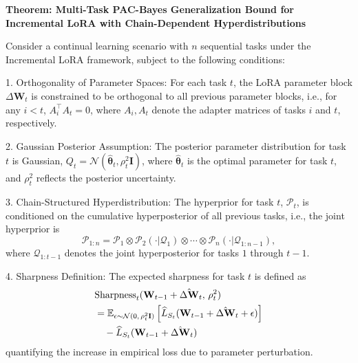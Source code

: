 \documentclass[letterpaper]{article} %
\begin{document}
\textbf{Theorem: Multi-Task PAC-Bayes Generalization Bound for Incremental LoRA with Chain-Dependent Hyperdistributions}


Consider a continual learning scenario with $n$ sequential tasks under the Incremental LoRA framework, subject to the following conditions:

1. Orthogonality of Parameter Spaces: For each task $t$, the LoRA parameter block $\Delta\mathbf{W}_t$ is constrained to be orthogonal to all previous parameter blocks, i.e., for any $i < t$, $A_i^\top A_t = 0$, where $A_i, A_t$ denote the adapter matrices of tasks $i$ and $t$, respectively.

2. Gaussian Posterior Assumption: The posterior parameter distribution for task $t$ is Gaussian, $Q_t = \mathcal{N}(\hat{\boldsymbol{\theta}}_t, \rho_t^2 \mathbf{I})$, where $\hat{\boldsymbol{\theta}}_t$ is the optimal parameter for task $t$, and $\rho_t^2$ reflects the posterior uncertainty.

3. Chain-Structured Hyperdistribution: The hyperprior for task $t$, $\mathcal{P}_t$, is conditioned on the cumulative hyperposterior of all previous tasks, i.e., the joint hyperprior is
   $$
   \mathcal{P}_{1:n} = \mathcal{P}_1 \otimes \mathcal{P}_2(\cdot|\mathcal{Q}_1) \otimes \cdots \otimes \mathcal{P}_n(\cdot|\mathcal{Q}_{1:n-1}),
   $$ where $\mathcal{Q}_{1:t-1}$ denotes the joint hyperposterior for tasks $1$ through $t-1$.

4. Sharpness Definition: The expected sharpness for task $t$ is defined as
\begin{align}
&\mathrm{Sharpness}_t(\mathbf{W}_{t-1} + \hat{\Delta\mathbf{W}}_t,\, \rho_t^2) \notag\\
& = \mathbb{E}_{\epsilon \sim \mathcal{N}(0,\, \rho_t^2 \mathbf{I})}
\left[ \widehat{L}_{S_t}(\mathbf{W}_{t-1} + \hat{\Delta\mathbf{W}}_t + \epsilon) \right] \notag\\
&\quad - \widehat{L}_{S_t}(\mathbf{W}_{t-1} + \hat{\Delta\mathbf{W}}_t) \notag
\end{align}
quantifying the increase in empirical loss due to parameter perturbation.
\end{document}

